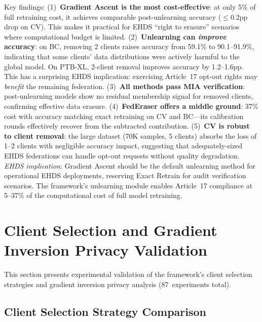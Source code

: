 \documentclass[conference]{IEEEtran}
\begin{document}
\begin{table}[htbp]
\vspace{1mm}
\footnotesize{Key findings: (1)~\textbf{Gradient Ascent is the most cost-effective}: at only 5\% of full retraining cost, it achieves comparable post-unlearning accuracy ($\leq$0.2pp drop on CV). This makes it practical for EHDS ``right to erasure'' scenarios where computational budget is limited. (2)~\textbf{Unlearning can \textit{improve} accuracy}: on BC, removing 2 clients raises accuracy from 59.1\% to 90.1--91.9\%, indicating that some clients' data distributions were actively harmful to the global model. On PTB-XL, 2-client removal improves accuracy by 1.2--1.6pp. This has a surprising EHDS implication: exercising Article~17 opt-out rights may \textit{benefit} the remaining federation. (3)~\textbf{All methods pass MIA verification}: post-unlearning models show no residual membership signal for removed clients, confirming effective data erasure. (4)~\textbf{FedEraser offers a middle ground}: 37\% cost with accuracy matching exact retraining on CV and BC---its calibration rounds effectively recover from the subtracted contribution. (5)~\textbf{CV is robust to client removal}: the large dataset (70K samples, 5 clients) absorbs the loss of 1--2 clients with negligible accuracy impact, suggesting that adequately-sized EHDS federations can handle opt-out requests without quality degradation. \textit{EHDS implication}: Gradient Ascent should be the default unlearning method for operational EHDS deployments, reserving Exact Retrain for audit verification scenarios. The framework's unlearning module enables Article~17 compliance at 5--37\% of the computational cost of full model retraining.}
\end{table}

\section{Client Selection and Gradient Inversion Privacy Validation}
\label{sec:cascade5}

This section presents experimental validation of the framework's client selection strategies and gradient inversion privacy analysis (87~experiments total).

\subsection{Client Selection Strategy Comparison}
\label{sec:client_selection}
\end{document}
